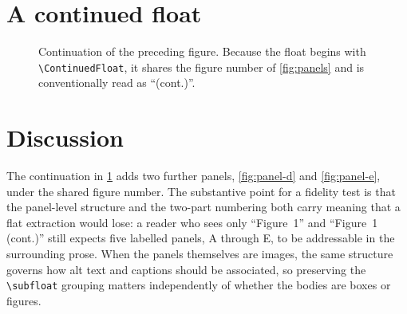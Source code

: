 \documentclass[11pt]{article}
\begin{document}
\section{A continued float}

\begin{figure}[htbp]
\ContinuedFloat
\centering
{}
\hfill
{}
\caption{Continuation of the preceding figure. Because the float begins with
  \texttt{\textbackslash ContinuedFloat}, it shares the figure number of
  \cref{fig:panels} and is conventionally read as ``(cont.)''.}
\label{fig:panels-cont}
\end{figure}

\section{Discussion}

The continuation in \cref{fig:panels-cont} adds two further panels,
\cref{fig:panel-d} and \cref{fig:panel-e}, under the shared figure number. The
substantive point for a fidelity test is that the panel-level structure and the
two-part numbering both carry meaning that a flat extraction would lose: a
reader who sees only ``Figure~1'' and ``Figure~1 (cont.)'' still expects five
labelled panels, A through E, to be addressable in the surrounding prose. When
the panels themselves are images, the same structure governs how alt text and
captions should be associated, so preserving the \verb|\subfloat| grouping
matters independently of whether the bodies are boxes or figures.
\end{document}
